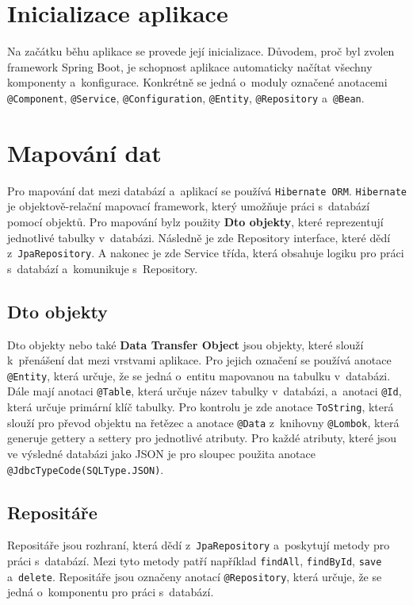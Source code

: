 \section{Inicializace aplikace}
Na začátku běhu aplikace se provede její inicializace.  
Důvodem, proč byl zvolen framework Spring Boot, je schopnost aplikace automaticky 
načítat všechny komponenty a~konfigurace.  
Konkrétně se jedná o~moduly označené anotacemi \texttt{@Component}, \texttt{@Service}, 
\texttt{@Configuration}, \texttt{@Entity}, \texttt{@Repository} a~\texttt{@Bean}.

\section{Mapování dat}
\label{sec:mapovaniDat}
Pro mapování dat mezi databází a~aplikací se používá \texttt{Hibernate ORM}.
\texttt{Hibernate} je objektově-relační mapovací framework, který umožňuje práci s~databází pomocí objektů.
Pro mapování bylz použity \textbf{Dto objekty}, které reprezentují jednotlivé tabulky v~databázi.
Následně je zde Repository interface, které dědí z~\texttt{JpaRepository}.
A nakonec je zde Service třída, která obsahuje logiku pro práci s~databází a~komunikuje s~Repository.

\subsection{Dto objekty}
Dto objekty nebo také \textbf{Data Transfer Object} jsou objekty, které slouží k~přenášení dat mezi vrstvami aplikace.
Pro jejich označení se používá anotace \texttt{@Entity}, která určuje, že se jedná o~entitu mapovanou na tabulku v~databázi.
Dále mají anotaci \texttt{@Table}, která určuje název tabulky v~databázi, a~anotaci \texttt{@Id}, která určuje primární klíč tabulky.
Pro kontrolu je zde anotace \texttt{ToString}, která slouží pro převod objektu na řetězec a anotace \texttt{@Data} 
z~knihovny \texttt{@Lombok}, která generuje gettery a settery pro jednotlivé atributy.
Pro každé atributy, které jsou ve výsledné databázi jako JSON je pro sloupec použita anotace \texttt{@JdbcTypeCode(SQLType.JSON)}.


\subsection{Repositáře}
Repositáře jsou rozhraní, která dědí z~\texttt{JpaRepository} a~poskytují metody pro práci s~databází.
Mezi tyto metody patří například \texttt{findAll}, \texttt{findById}, \texttt{save} a~\texttt{delete}.
Repositáře jsou označeny anotací \texttt{@Repository}, která určuje, že se jedná o~komponentu pro práci s~databází.


